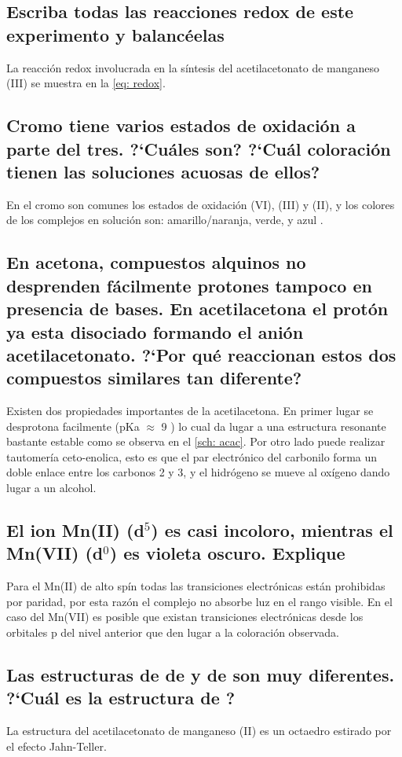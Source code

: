 \documentclass[fleqn,10pt]{SelfArx} %
\begin{document}
	\subsection{Escriba todas las reacciones redox de este experimento y balanc\'eelas}
	La reacci\'on redox involucrada en la s\'intesis del acetilacetonato de manganeso (III) se muestra en la \autoref{eq: redox}.
	
	\subsection{Cromo tiene varios estados de oxidaci\'on a parte del tres. ?`Cu\'ales son? ?`Cu\'al coloraci\'on tienen las soluciones acuosas de ellos?}
	En el cromo son comunes los estados de oxidaci\'on (VI), (III) y (II), y los colores de los complejos en soluci\'on son: amarillo/naranja, verde, y azul \cite{Nature}.
	
	\subsection{En acetona, compuestos alquinos no desprenden f\'acilmente protones tampoco en presencia de bases. En acetilacetona el prot\'on ya esta disociado formando el ani\'on acetilacetonato. ?`Por qu\'e reaccionan estos dos compuestos similares tan diferente?}
	Existen dos propiedades importantes de la acetilacetona. En primer lugar se desprotona facilmente (pKa $\approx$ 9 \cite{Harris}) lo cual da lugar a una estructura resonante bastante estable como se observa en el \autoref{sch: acac}. Por otro lado puede realizar tautomer\'ia ceto-enolica, esto es que el par electr\'onico del carbonilo forma un doble enlace entre los carbonos 2 y 3, y el hidr\'ogeno se mueve al ox\'igeno dando lugar a un alcohol.
	
	\subsection{El ion Mn(II) (d$^5$) es casi incoloro, mientras el Mn(VII) (d$^0$) es violeta oscuro. Explique}
	Para el Mn(II) de alto sp\'in todas las transiciones electr\'onicas est\'an prohibidas por paridad, por esta raz\'on el complejo no absorbe luz en el rango visible. En el caso del Mn(VII) es posible que existan transiciones electr\'onicas desde los orbitales p del nivel anterior que den lugar a la coloraci\'on observada.
	
	\subsection{Las estructuras de de  y de  son muy diferentes. ?`Cu\'al es la estructura de ?}
	La estructura del acetilacetonato de manganeso (II) es un octaedro estirado por el efecto Jahn-Teller.
	
\end{document}
